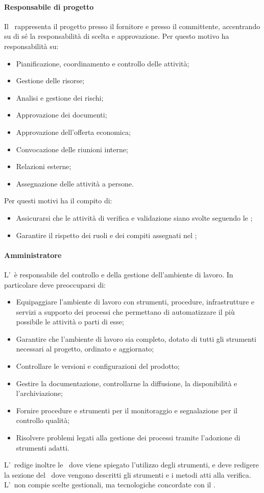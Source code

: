 \documentclass[../NormeProgetto.tex]{subfiles}
\begin{document}
			\paragraph{Responsabile di progetto}
			Il \responsabilediprogetto\ rappresenta il progetto presso il fornitore e presso il committente, accentrando su di sé la responsabilità di scelta e approvazione. Per questo motivo ha responsabilità su:
			\begin{itemize}
			\item Pianificazione, coordinamento e controllo delle attività;
			\item Gestione delle risorse;
			\item Analisi e gestione dei rischi;
			\item Approvazione dei documenti;
			\item Approvazione dell'offerta economica;
			\item Convocazione delle riunioni interne;
			\item Relazioni esterne;
			\item Assegnazione delle attività a persone.
			\end{itemize}
			Per questi motivi ha il compito di:
			\begin{itemize}
			\item Assicurarsi che le attività di verifica e validazione siano svolte seguendo le \normediprogetto;
			\item Garantire il rispetto dei ruoli e dei compiti assegnati nel \pianodiprogetto;
			\end{itemize}
			\paragraph{Amministratore}
			L'\amministratore\ è responsabile del controllo e della gestione dell'ambiente di lavoro. In particolare deve preoccuparsi di:
			\begin{itemize}
			\item Equipaggiare l'ambiente di lavoro con strumenti, procedure, infrastrutture e servizi a supporto dei processi che permettano di automatizzare il più possibile le attività o parti di esse;
			\item Garantire che l'ambiente di lavoro sia completo, dotato di tutti gli strumenti necessari al progetto, ordinato e aggiornato;
			\item Controllare le versioni e configurazioni del prodotto;
			\item Gestire la documentazione, controllarne la diffusione, la disponibilità e l'archiviazione;
			\item Fornire procedure e strumenti per il monitoraggio e segnalazione per il controllo qualità;
			\item Risolvere problemi legati alla gestione dei processi tramite l'adozione di strumenti adatti.
			\end{itemize}
			L'\amministratore\ redige inoltre le \normediprogetto\, dove viene spiegato l'utilizzo degli strumenti, e deve redigere la sezione del \pianodiqualifica\ dove vengono descritti gli strumenti e i metodi atti alla verifica. L'\amministratore\ non compie scelte gestionali, ma tecnologiche concordate con il \responsabilediprogetto.
\end{document}
